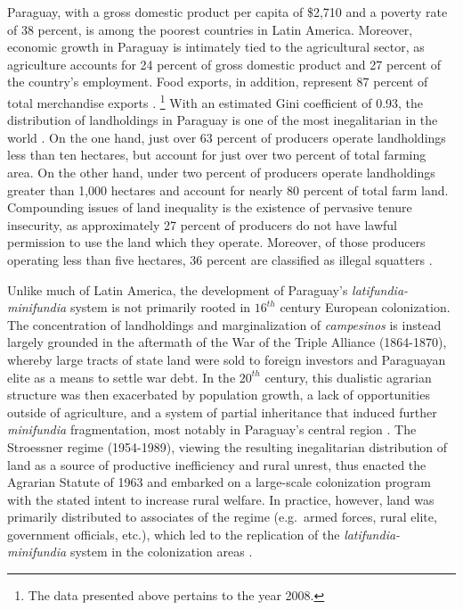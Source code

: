 \documentclass[english]{article}
\begin{document}
Paraguay, with a gross domestic product per capita of \$2,710 and a poverty 
rate of 38 percent, is among the poorest countries in Latin America. 
Moreover, economic growth in Paraguay is intimately tied to the agricultural 
sector, as agriculture accounts for 24 percent of gross domestic product and 
27 percent of the country's employment. 
Food exports, in addition, represent 87 percent of total merchandise exports 
\citep{wdi2012}.%
\footnote{The data presented above pertains to the year 2008.} 
With an estimated Gini coefficient of 0.93, the distribution of landholdings in 
Paraguay is one of the most inegalitarian in the world \citep{lipton2009}. 
On the one hand, just over 63 percent of producers operate landholdings less 
than ten hectares, but account for just over two percent of total farming area.  
On the other hand, under two percent of producers operate landholdings 
greater than 1,000 hectares and account for nearly 80 percent of total farm 
land. 
Compounding issues of land inequality is the existence of pervasive tenure 
insecurity, as approximately 27 percent of producers do not have lawful 
permission to use the land which they operate. 
Moreover, of those producers operating less than five hectares, 36 percent are 
classified as illegal squatters \citep{mag2012}. 

Unlike much of Latin America, the development of Paraguay's 
\emph{latifundia-minifundia} system is not primarily rooted in $16^{th}$ 
century European colonization.
The concentration of landholdings and marginalization of 
\emph{campesinos} is instead largely grounded in the aftermath of the War 
of the Triple Alliance (1864-1870), whereby large tracts of state land were sold 
to foreign investors and Paraguayan elite as a means to settle war debt.
In the $20^{th}$ century, this dualistic agrarian structure was then exacerbated 
by population growth, a lack of opportunities outside of
agriculture, and a system of partial inheritance that induced further 
\emph{minifundia} fragmentation, most notably in Paraguay's central region
\citep{baer1984, danielsen2009}.
The Stroessner regime (1954-1989), viewing the resulting inegalitarian 
distribution of land as a source of productive inefficiency and rural unrest, 
thus enacted the Agrarian Statute of 1963 and embarked on a large-scale 
colonization program with the stated intent to increase rural welfare.
In practice, however, land was primarily distributed to associates of the 
regime (e.g.\ armed forces, rural elite, government officials, etc.), which led to 
the replication of the \emph{latifundia-minifundia} system in the 
colonization areas \citep{weisskoff1992, nagel1999}.
\end{document}

